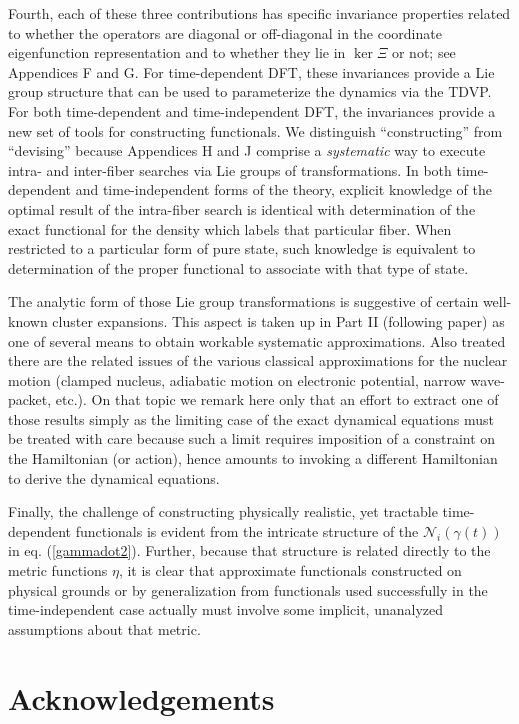 \documentclass[aps,preprint]{revtex4}%
\begin{document}
Fourth, each of these three contributions has specific invariance properties
related to whether the operators are diagonal or off-diagonal in the
coordinate eigenfunction representation and to whether they lie in $\ker\Xi$
or not; see Appendices F and G. For time-dependent DFT, these invariances
provide a Lie group structure that can be used to parameterize the dynamics
via the TDVP. For both time-dependent and time-independent DFT, the
invariances provide a new set of tools for constructing functionals. We
distinguish ``constructing'' from ``devising'' because Appendices H and J
comprise a \emph{systematic} way to execute intra- and inter-fiber searches
via Lie groups of transformations. In both time-dependent and time-independent
forms of the theory, explicit knowledge of the optimal result of the
intra-fiber search is identical with determination of the exact functional for
the density which labels that particular fiber. When restricted to a
particular form of pure state, such knowledge is equivalent to determination
of the proper functional to associate with that type of state.

The analytic form of those Lie group transformations is suggestive of certain
well-known cluster expansions.\cite{Blaizot86} This aspect is taken up in Part
II (following paper) as one of several means to obtain workable systematic
approximations. Also treated there are the related issues of the various
classical approximations for the nuclear motion (clamped nucleus, adiabatic
motion on electronic potential, narrow wave-packet, etc.). On that topic we
remark here only that an effort to extract one of those results simply as the
limiting case of the exact dynamical equations must be treated with care
because such a limit requires imposition of a constraint on the Hamiltonian
(or action), hence amounts to invoking a different Hamiltonian to derive the
dynamical equations.

Finally, the challenge of constructing physically realistic, yet tractable
time-dependent functionals is evident from the intricate structure of the
$\mathcal{N}_{i} (\gamma(t))$ in eq. (\ref{gammadot2}). Further, because that
structure is related directly to the metric functions $\eta$, it is clear that
approximate functionals constructed on physical grounds or by generalization
from functionals used successfully in the time-independent case actually must
involve some implicit, unanalyzed assumptions about that metric.

\section{Acknowledgements}
\end{document}
